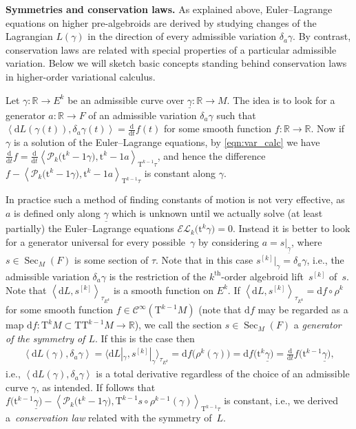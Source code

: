 \documentclass[10pt,a4paper]{amsart}
\newcommand{\thh}[1]{#1^{\mathrm{th}}} %
\newcommand{\R}{\mathbb{R}}
\newcommand{\und}{\underline}
\newcommand{\Sec}{\operatorname{Sec}}
\newcommand{\dd}{\mathrm{d}}
\newcommand{\ra}{\rightarrow}
\newcommand{\del}{\delta}
\newcommand{\prealg}{pre-algebroid} %
\newcommand{\T}{\mathrm{T}} %
\newcommand{\TT}[1]{\mathrm{T}^{#1}} %
\newcommand{\tclass}[2]{\bm{\mathrm{t}}^{#1}#2} %
\newcommand{\dbydt}{\frac{\mathrm{d}}{\mathrm{d}t}}
\newcommand{\Cf}{\mathcal{C}^\infty}
\def\<#1>{\left\langle #1\right\rangle}
\numberwithin{equation}{section}
\theoremstyle{definition}
\begin{document}
{\bf Symmetries and conservation laws.} As explained above, Euler--Lagrange equations on higher \prealg s are derived by studying changes of the Lagrangian $L(\gamma)$ in the direction of every admissible variation $\del_a\gamma$. By contrast, conservation laws are related with special properties of a particular admissible variation. Below we will sketch basic concepts standing behind conservation laws in higher-order variational calculus.

Let $\gamma\colon \R\ra E^k$ be an admissible curve over $\und{\gamma}\colon \R\ra M$. The idea is to look for a generator $a\colon \R\ra F$ of an admissible variation $\del_a\gamma$ such that $\<\dd L(\gamma (t)),\del_a\gamma (t)>=\dbydt f (t)$ for some smooth function $f\colon \R\ra \R$. Now if $\gamma$ is a solution of the Euler--Lagrange equations, by \eqref{eqn:var_calc} we have $\dbydt f=\dbydt{\<\mathcal{P}_k\big(\tclass{k-1}{\gamma}\big), \tclass{k-1}a>_{\TT{k-1}\tau}}$, and hence the difference $f-\<\mathcal{P}_k\big( \tclass{k-1}{\gamma}\big), \tclass{k-1}a>_{\TT{k-1}\tau}$ is constant along $\gamma$.

In practice such a method of finding constants of motion is not very effective, as $a$ is defined only along $\und{\gamma}$ which is unknown until we actually solve (at least partially) the Euler--Lagrange equations $\mathcal{EL}_k\big(\tclass k{\gamma}\big)=0$. Instead it is better to look for a generator universal for every possible~$\gamma$ by considering $a=s|_{\und{\gamma}}$, where $s\in\Sec_M(F)$ is some section of $\tau$. Note that in this case \mbox{$s^{[k]}|_{\gamma}=\del_a\gamma$}, i.e., the admissible variation $\del_a\gamma$ is the restriction of the $\thh{k}$-order algebroid lift~$s^{[k]}$ of~$s$.
Note that $\<\dd L,s^{[k]}>_{\tau_{E^k}}$ is a smooth function on $E^k$. If $\<\dd L,s^{[k]}>_{\tau_{E^k}}=\dd f \circ \rho^k$ for some smooth function $f\in \Cf(\TT{k-1}M)$ (note that $\dd f$ may be regarded as a map $\dd f\colon \TT{k}M\subset\T\TT{k-1}M\ra \R$), we call the section $s\in\Sec_M(F)$ a \emph{generator of the symmetry of $L$}. If this is the case then
\begin{gather*}
\<\dd L(\gamma),\del_a\gamma>=\big\langle\dd L|_{\gamma},s^{[k]}|_{\gamma}\big\rangle_{\tau_{E^k}}=\dd f\big(\rho^k(\gamma)\big)=\dd f\big( \tclass {k}{\und{\gamma}}\big)=\dbydt{f\big(\tclass{k-1}{\und{\gamma}}\big)},
\end{gather*}
 i.e., $\<\dd L(\gamma),\del_a\gamma>$ is a total derivative regardless of the choice of an admissible curve $\gamma$, as intended.
If follows that
$f\big( \tclass{k-1}{\und{\gamma}}\big)-\<\mathcal{P}_k\big(\tclass{k-1}{\gamma}\big), {\T^{k-1}{s}\circ \rho^{k-1}(\gamma)}>_{\TT{k-1}{\tau}}$ is constant, i.e., we derived a~\emph{conservation law}
related with the symmetry of~$L$.
\end{document}
